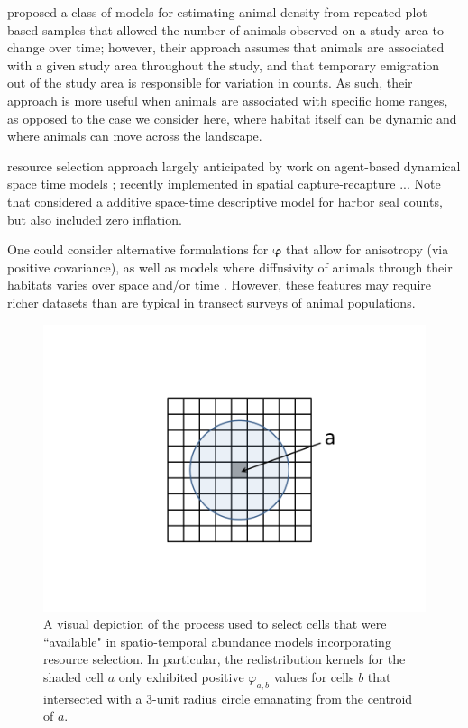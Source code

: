 \documentclass[times,mee,doublespace,]{besauth2}
\begin{document}
\citet{ChandlerEtAl2011} proposed a class of models for estimating animal density from repeated plot-based samples that allowed the number of animals observed on a study area to change over time; however, their approach assumes that animals are associated with a given study area throughout the study, and that temporary emigration out of the study area is responsible for variation in counts.  As such, their approach is more useful when animals are associated with specific home ranges, as opposed to the case we consider here, where habitat itself can be dynamic and where animals can move across the landscape.

resource selection approach largely anticipated by work on agent-based dynamical space time models  \citep{HootenWikle2010}; recently implemented in spatial capture-recapture \citep{RoyleEtAl2013}... Note that \citet{VerHoefJansen2007} considered a additive space-time descriptive model for harbor seal counts, but also included zero inflation.

One could consider alternative formulations for $\boldsymbol{\varphi}$ that allow for anisotropy (via positive covariance), as well as models where diffusivity of animals through their habitats varies over space and/or time \citep[see e.g.][]{WikleEtAl2001}.  However, these features may require richer datasets than are typical in transect surveys of animal populations.





\pagebreak

\begin{figure}
\begin{center}
\includegraphics[width=170mm]{rs_kernel.png}
\caption{A visual depiction of the process used to select cells that were ``available" in spatio-temporal abundance models incorporating resource selection.  In particular, the redistribution kernels for the shaded cell $a$ only exhibited positive $\varphi_{a,b}$ values for cells $b$ that intersected with a 3-unit radius circle emanating from the centroid of $a$.} \label{fig:res-sel}
\end{center}
\end{figure}
\end{document}
